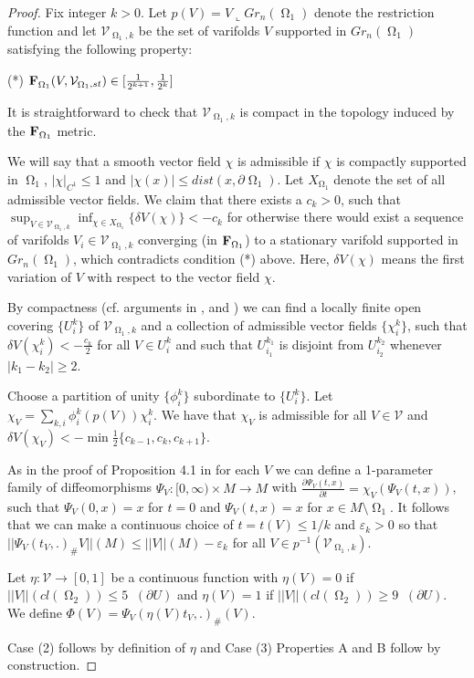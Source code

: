 \documentclass[12pt]{amsart}
\DeclareMathOperator{\Hn}{\mathcal{H}^n}
\DeclareMathOperator{\Om}{\Omega}
\newcommand{\Cgs}{5 \Hn(\partial U)}
\newcommand{\Clgs}{9 \Hn(\partial U)}
\theoremstyle{definition}
\begin{document}
\begin{proof}
Fix integer $k>0$.
Let $p(V) = V \llcorner Gr_n(\Om_1)$ denote the restriction function
and let $\mathcal{V}_{\Om_1,k}$ be the set of varifolds $V$
supported in $Gr_n(\Om_1)$ 
satisfying the following property:


(*) ${\bf F}_{\Om_1}(V, \mathcal{V}_{\Om_1,st}) \in [\frac{1}{2^{k+1}},\frac{1}{2^k}]$

It is straightforward to check that
$\mathcal{V}_{\Om_1,k}$ is compact in the topology induced by the ${\bf F}_{\Om_1}$ metric.

We will say that a smooth vector field $\chi$ is admissible if $\chi$
is compactly supported in $\Om_1$, 
$| \chi |_{C^1} \leq 1$ and $|\chi(x)| \leq dist(x, \partial \Om_1)$.
Let $X_{\Om_1}$ denote the set of all admissible vector fields.
We claim that there exists a $c_k >0$,
such that $\sup_{V \in \mathcal{V}_{\Om_1,k}} \inf_{\chi \in X_{\Om_1}}  \{ \delta V(\chi) \} < -c_k$
for otherwise there would exist a sequence of varifolds $V_i \in \mathcal{V}_{\Om_1,k}$ 
converging (in ${\bf F}_{\Om_1}$) to a stationary varifold supported in $Gr_n(\Om_1)$,
which contradicts condition (*) above.  Here, $\delta V(\chi)$ means the first variation
of $V$ with respect to the vector field $\chi$.

By compactness (cf. arguments in \cite[Theorem 4.3]{Pi},  \cite[Proposition 4.1]{CD}
 and \cite[Proposition 8.5]{MN1})
 we can find a locally finite open covering $\{ U^k_i \}$
of $\mathcal{V}_{\Om_1,k}$ and a collection of admissible vector fields
$\{ \chi^k_i \}$, such that $\delta V(\chi^k_i) < -\frac{c_k}{2}$
for all $V \in U^k_i$ and such that $ U^{k_1}_{i_1}$ is disjoint from  $U^{k_2}_{i_2}$
whenever $|k_1 - k_2| \geq 2$.

Choose a partition of unity $\{ \phi^k_i \}$ subordinate
to $\{ U^k_i \}$.
Let $\chi_V = \sum_{k,i} \phi^k_i(p(V)) \chi^k_i$.
We have that $\chi_{V}$ is admissible for all $V \in \mathcal{V}$
and $\delta V(\chi_{V}) < -\min \frac{1}{2}\{c_{k-1}, c_k, c_{k+1} \}$.

As in the proof of Proposition 4.1 in \cite{CD}
for each $V$ we can define a 1-parameter family of diffeomorphisms 
$\Psi_V: [0, \infty) \times M \rightarrow M$ with
$\frac{\partial \Psi_V (t,x)}{\partial t} = \chi_{V}(\Psi_V (t,x))$,
such that
$\Psi_V(0,x) = x$ for $t=0$ and $\Psi_V(t,x) = x$ for $x \in M \setminus \Om_1$.
It follows that we can make a continuous choice of $t = t(V)\leq 1/k$
and $\varepsilon_k>0$
so that $||\Psi_{V}(t_V, .)_{\#} V||(M) \leq ||V||(M) - \varepsilon_k$
for all $V \in p^{-1}(\mathcal{V}_{\Om_1,k})$.

Let $\eta: \mathcal{V} \rightarrow [0,1]$ be a continuous function
with $\eta(V) = 0$ if $||V ||(cl(\Om_2)) \leq \Cgs$
and $\eta(V) = 1$ if $||V ||(cl(\Om_2)) \geq \Clgs$.
We define $\Phi(V) = \Psi_{V}(\eta(V) t_V, .)_{ \#}(V)$.

Case (2) follows by definition of $\eta$
and Case (3) Properties A and B follow by construction.
\end{proof}
\end{document}
